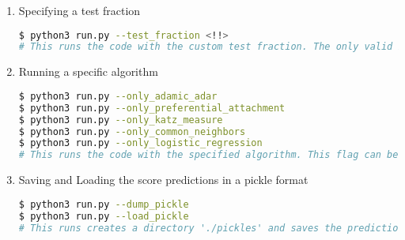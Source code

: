 \documentclass[12pt, a4paper]{article}
\begin{document}
\begin{enumerate}
\begin{lstlisting}[language=Bash]
$ python3 run.py --data <path to dataset>
# This runs the default code on the dataset specified by the flag.
\end{lstlisting}
\newpage
\item Specifying a test fraction
\begin{lstlisting}[language=Bash]
$ python3 run.py --test_fraction <!!>
# This runs the code with the custom test fraction. The only valid input for this argument are {0.1, 0.2, 0.3, 0.4}. Any other input will raise a KeyError.
\end{lstlisting}
\item Running a specific algorithm
\begin{lstlisting}[language=Bash]
$ python3 run.py --only_adamic_adar
$ python3 run.py --only_preferential_attachment
$ python3 run.py --only_katz_measure
$ python3 run.py --only_common_neighbors
$ python3 run.py --only_logistic_regression
# This runs the code with the specified algorithm. This flag can be combined with the flag for specifying a test fraction
\end{lstlisting}
\item Saving and Loading the score predictions in a pickle format
\begin{lstlisting}[language=Bash]
$ python3 run.py --dump_pickle
$ python3 run.py --load_pickle
# This runs creates a directory './pickles' and saves the predictions in this folder. These pickles can subsequently be loaded to give the MAP/MRR analysis faster.
\end{lstlisting}
\end{enumerate}
\end{document}

